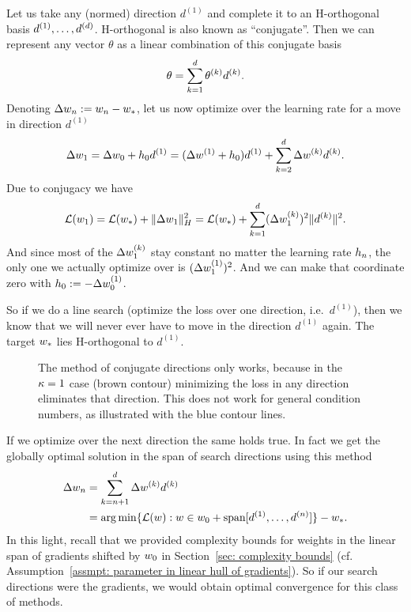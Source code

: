 Let us take any (normed) direction \(d^{(1)}\) and complete it to an H-orthogonal
basis \(d^{(1)},\dots,d^{(d)}\). H-orthogonal is also known as
``conjugate''. Then we can represent any vector \(\theta\) as a linear
combination of this conjugate basis
\begin{align*}
	\theta = \sum_{k=1}^d \theta^{(k)} d^{(k)}.
\end{align*}
Denoting \(\Delta w_n := w_n -w_*\), let us now optimize over
the learning rate for a move in direction \(d^{(1)}\)
\begin{align*}
	\Delta w_{1} = \Delta w_0 + h_0 d^{(1)}
	= (\Delta w^{(1)} + h_0)d^{(1)}
	+ \sum_{k=2}^d \Delta w^{(k)} d^{(k)}.
\end{align*}
Due to conjugacy we have
\begin{align*}
	\mathcal{L}(w_{1})
	= \mathcal{L}(w_*) + \|\Delta w_{1}\|_H^2
	= \mathcal{L}(w_*) + \sum_{k=1}^{d} (\Delta w_{1}^{(k)})^2\|d^{(k)}\|^2.
\end{align*}
And since most of the \(\Delta w^{(k)}_{1}\) stay constant no matter the
learning rate \(h_n\), the only one we actually optimize over is
\((\Delta w^{(1)}_{1})^2\).
And we can make that coordinate zero with \(h_0 :=-\Delta w_0^{(1)}\).

So if we do a line search (optimize the loss over one direction, i.e.\ \(d^{(1)}\)),
then we know that we will never ever have to move in the direction \(d^{(1)}\)
again. The target \(w_*\) lies H-orthogonal to \(d^{(1)}\).
%
\begin{figure}[h]
	\centering
	\def\svgwidth{1\textwidth}
	
	\caption{
		The method of conjugate directions only works, because in the
		\(\kappa=1\) case (brown contour) minimizing the loss in any direction
		eliminates that direction. This does not work for general condition numbers,
		as illustrated with the blue contour lines.
	}
	\label{fig: conjugate direction depends on condition one}
\end{figure}
%
If we optimize over the next direction the same holds true. In fact we get the
globally optimal solution in the span of search directions using this method 
\begin{align*}
	\Delta w_n &= \sum_{k=n+1}^d\Delta w^{(k)} d^{(k)}\\
	&= \arg\min \{
		\mathcal{L}(w) : w \in w_0 + \text{span}[d^{(1)},\dots, d^{(n)}]
	\} - w_*.
\end{align*}
In this light, recall that we provided complexity bounds for weights in the
linear span of gradients shifted by \(w_0\) in Section~\ref{sec: complexity bounds}
(cf. Assumption~\ref{assmpt: parameter in linear hull of gradients}). So if our
search directions were the gradients, we would obtain optimal convergence for
this class of methods.

